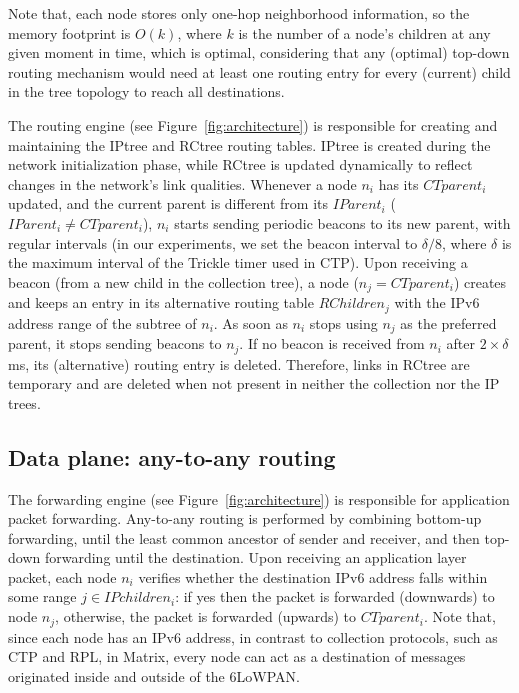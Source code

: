 Note that, each node stores only one-hop
neighborhood information, so the memory footprint is $O(k)$, where $k$ is the
number of a node's children at any given moment in time, which is optimal,
considering that any (optimal) top-down routing mechanism would need at
least one routing entry for every (current) child in the tree topology to reach
all destinations.

The routing engine (see Figure~\ref{fig:architecture}) is responsible for
creating and maintaining the IPtree and RCtree routing tables. IPtree is created
during the network initialization phase, while RCtree is updated dynamically to
reflect changes in the network's link qualities. Whenever a node $n_i$ has its
$CTparent_i$ updated, and the current parent is different from its
$IParent_i$ ($IParent_i \neq CTparent_i$), $n_i$ starts sending periodic beacons
to its new parent, with regular intervals (in our experiments, we set the beacon
interval to $\delta/8$, where $\delta$ is the maximum interval of the
Trickle timer used in CTP).
Upon receiving a beacon (from a new child in the collection tree), a node
($n_j = CTparent_i$) creates and keeps an entry in its alternative
routing table $RChildren_j$ with the IPv6 address range of the subtree of $n_i$. As soon as $n_i$
stops using $n_j$ as the preferred parent, it stops sending beacons to $n_j$.
If no beacon is received from $n_i$ after $2\times\delta$ ms, its (alternative)
routing entry is deleted. Therefore, links in RCtree are temporary and are deleted when not present in neither the
collection nor the IP trees.

\subsection{Data plane: any-to-any routing}

The forwarding engine (see Figure~\ref{fig:architecture}) is responsible for
application packet forwarding. Any-to-any routing is performed by combining
  bottom-up forwarding, until the least common ancestor of sender and
  receiver, and then top-down forwarding until the destination. Upon receiving
  an application layer packet, each node $n_i$ verifies whether the destination IPv6 address falls within some range
$j \in IPchildren_i$: if yes then the packet is forwarded
(downwards) to node $n_j$, otherwise, the packet is forwarded
(upwards) to $CTparent_i$. Note that, since each node has an IPv6
address, in contrast to collection protocols, such as CTP and RPL,
in Matrix, every node can act as a destination of messages
originated inside and outside of the 6LoWPAN.

